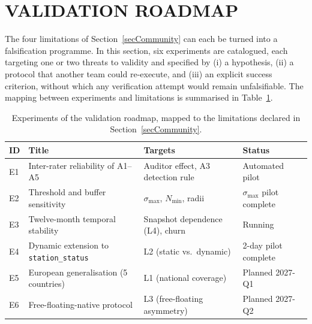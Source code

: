 \documentclass[a4paper,twoside]{article}
\begin{document}
\section{\uppercase{Validation Roadmap}}
\label{secExperiments}

The four limitations of Section~\ref{secCommunity} can each be
turned into a falsification programme. In this section, six
experiments are catalogued, each targeting one or two threats to
validity and specified by (i) a hypothesis, (ii) a protocol that
another team could re-execute, and (iii) an explicit success
criterion, without which any verification attempt would remain
unfalsifiable. The mapping between experiments and limitations
is summarised in Table~\ref{tab:roadmap}.

\begin{table}[ht]
\centering
\caption{Experiments of the validation roadmap, mapped to the
limitations declared in Section~\ref{secCommunity}.}
\label{tab:roadmap}
\small
\begin{tabular}{@{}llll@{}}
\toprule
\textbf{ID} & \textbf{Title} & \textbf{Targets} &
\textbf{Status}\\
\midrule
E1 & Inter-rater reliability of A1--A5 &
    Auditor effect, A3 detection rule       & Automated pilot\\
E2 & Threshold and buffer sensitivity      &
    $\sigma_{\max}$, $N_{\min}$, radii      & $\sigma_{\max}$ pilot complete\\
E3 & Twelve-month temporal stability       &
    Snapshot dependence (L4), churn         & Running\\
E4 & Dynamic extension to \texttt{station\_status} &
    L2 (static vs.\ dynamic)                & 2-day pilot complete\\
E5 & European generalisation (5 countries) &
    L1 (national coverage)                  & Planned 2027-Q1\\
E6 & Free-floating-native protocol         &
    L3 (free-floating asymmetry)            & Planned 2027-Q2\\
\bottomrule
\end{tabular}
\end{table}
\end{document}
